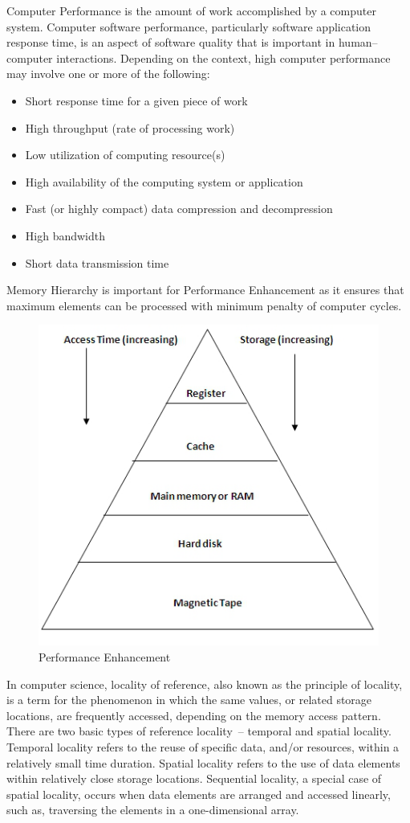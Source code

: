 
Computer Performance is the amount of work accomplished by a computer system. Computer software performance, particularly software application response time, is an aspect of software quality that is important in human–computer interactions. Depending on the context, high computer performance may involve one or more of the following:
\begin{itemize}
\item Short response time for a given piece of work
\item High throughput (rate of processing work)
\item Low utilization of computing resource(s)
\item High availability of the computing system or application
\item Fast (or highly compact) data compression and decompression
\item High bandwidth
\item Short data transmission time
\end{itemize}

Memory Hierarchy is important for Performance Enhancement as it ensures that maximum elements can be processed with minimum penalty of computer cycles.
\begin{figure}[ht]
\centering
\includegraphics[scale=0.2]{images/perf.png}
\caption{Performance Enhancement}
\end{figure}
In computer science, locality of reference, also known as the principle of locality, is a term for the phenomenon in which the same values, or related storage locations, are frequently accessed, depending on the memory access pattern. There are two basic types of reference locality – temporal and spatial locality. Temporal locality refers to the reuse of specific data, and/or resources, within a relatively small time duration. Spatial locality refers to the use of data elements within relatively close storage locations. Sequential locality, a special case of spatial locality, occurs when data elements are arranged and accessed linearly, such as, traversing the elements in a one-dimensional array.
